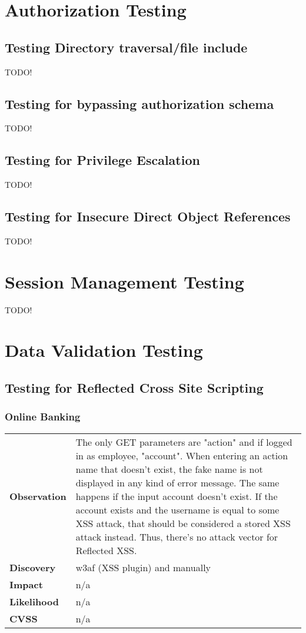 \clearpage

\section{Authorization Testing}

\subsection{Testing Directory traversal/file include}
TODO!
\subsection{Testing for bypassing authorization schema}
TODO!
\subsection{Testing for Privilege Escalation}
TODO!
\subsection{Testing for Insecure Direct Object References}
TODO!

\section{Session Management Testing}
TODO!

\section{Data Validation Testing}

\subsection{Testing for Reflected Cross Site Scripting}

\subsubsection*{Online Banking}

\begin{tabular}{l|p{10cm}}
\textbf{Observation} & The only GET parameters are "action" and if logged in as employee, "account". When entering an action name that doesn't exist, the fake name is not displayed in any kind of error message. The same happens if the input account doesn't exist. If the account exists and the username is equal to some XSS attack, that should be considered a stored XSS attack instead. Thus, there's no attack vector for Reflected XSS. \\
\textbf{Discovery} & w3af (XSS plugin) and manually  \\
\textbf{Impact} & n/a \\
\textbf{Likelihood} & n/a \\
\textbf{CVSS} & n/a \\
\end{tabular}

